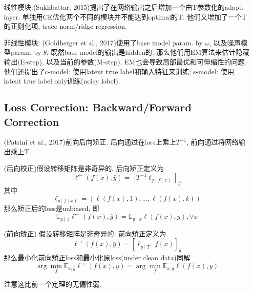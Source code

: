 \documentclass{article}
\begin{document}
线性模块:(Sukhbattar, 2015)提出了在网络输出之后增加一个由T参数化的adapt. layer. 单独用CE优化两个不同的模块并不能达到optimal的T. 他们又增加了一个T的正则化项, trace norm/ridge regression.

非线性模块: (Goldberger et al., 2017)使用了base model param. by $\omega$, 以及噪声模型param. by $\theta$. 既然base model的输出是hidden的, 那么他们用EM算法来估计隐藏输出(E-step), 以及当前的参数(M-step). EM也会导致局部最优和可伸缩性的问题.
他们还提出了c-model: 使用latent true label和输入特征来训练; s-model: 使用latent true label only训练(noisy label).

\subsection{Loss Correction: Backward/Forward Correction}

(Patrini et al., 2017)前向后向矫正. 后向通过在loss上乘上$T^{-1}$, 前向通过将网络输出乘上T.

\begin{theorem}
    (后向校正)假设转移矩阵是非奇异的. 后向矫正定义为
    \begin{equation}
        \ell^{\leftarrow}(f(x), \bar{y})=\left[T^{-1} \ell_{y \mid f(x)}\right]_{\bar{y}}
    \end{equation}
    其中
    \begin{equation}
        \ell_{y \mid f(x)}=(\ell(f(x), 1), \ldots, \ell(f(x), k))
    \end{equation}
    那么矫正后的loss是unbiased, 即
    \begin{equation}
        \mathbb{E}_{\bar{y} \mid x} \ell^{\leftarrow}(f(x), \bar{y})=\mathbb{E}_{y \mid x} \ell(f(x), y), \forall x
    \end{equation}
\end{theorem}

\begin{theorem}
    (前向矫正)
    假设转移矩阵是非奇异的. 前向矫正定义为
    \begin{equation}
        \ell^{\rightarrow}(f(x), \bar{y})=\left[\ell_{y \mid T^{\top}} f(x)\right]_{\bar{y}}
    \end{equation}
    那么最小化前向矫正loss和最小化原loss(under clean data)同解
    \begin{equation}
        \arg \min _{f} \mathbb{E}_{x, \bar{y}} \ell^{\rightarrow}(f(x), \bar{y})=\arg \min _{f} \mathbb{E}_{x, y} \ell(f(x), y)
    \end{equation}
\end{theorem}
注意这比前一个定理的无偏性弱.
\end{document}
